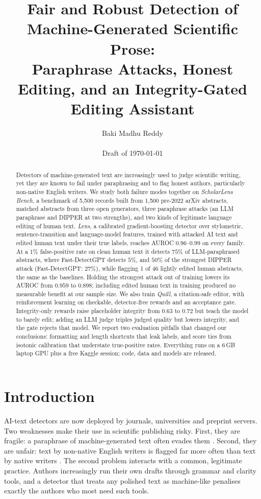 \documentclass[11pt]{article}
\title{Fair and Robust Detection of Machine-Generated Scientific Prose:\\
Paraphrase Attacks, Honest Editing, and an Integrity-Gated Editing Assistant}
\author{Baki Madhu Reddy\\ \todo{affiliation} \\ \small Draft of \today}
\date{}
\begin{document}
\maketitle

\begin{abstract}
Detectors of machine-generated text are increasingly used to judge scientific writing, yet they are known to fail under paraphrasing and to flag honest authors, particularly non-native English writers.
We study both failure modes together on \emph{ScholarLens Bench}, a benchmark of 5{,}500 records built from 1{,}500 pre-2022 arXiv abstracts, matched abstracts from three open generators, three paraphrase attacks (an LLM paraphrase and DIPPER at two strengths), and two kinds of legitimate language editing of human text.
\emph{Lens}, a calibrated gradient-boosting detector over stylometric, sentence-transition and language-model features, trained with attacked AI text and edited human text under their true labels, reaches AUROC $0.96$--$0.99$ on every family.
At a 1\% false-positive rate on clean human text it detects $75\%$ of LLM-paraphrased abstracts, where Fast-DetectGPT detects $5\%$, and $50\%$ of the strongest DIPPER attack (Fast-DetectGPT: $27\%$), while flagging 1 of 46 lightly edited human abstracts, the same as the baselines.
Holding the strongest attack out of training lowers its AUROC from $0.959$ to $0.898$; including edited human text in training produced no measurable benefit at our sample size.
We also train \emph{Quill}, a citation-safe editor, with reinforcement learning on checkable, detector-free rewards and an acceptance gate.
Integrity-only rewards raise placeholder integrity from $0.63$ to $0.72$ but teach the model to barely edit; adding an LLM judge triples judged quality but lowers integrity, and the gate rejects that model.
We report two evaluation pitfalls that changed our conclusions: formatting and length shortcuts that leak labels, and score ties from isotonic calibration that understate true-positive rates.
Everything runs on a 6\,GB laptop GPU plus a free Kaggle session; code, data and models are released.
\end{abstract}

\section{Introduction}

AI-text detectors are now deployed by journals, universities and preprint servers.
Two weaknesses make their use in scientific publishing risky.
First, they are fragile: a paraphrase of machine-generated text often evades them \citep{krishna2023paraphrasing,sadasivan2023reliably}.
Second, they are unfair: text by non-native English writers is flagged far more often than text by native writers \citep{liang2023biased}.
The second problem interacts with a common, legitimate practice.
Authors increasingly run their own drafts through grammar and clarity tools, and a detector that treats any polished text as machine-like penalises exactly the authors who most need such tools.
\end{document}
